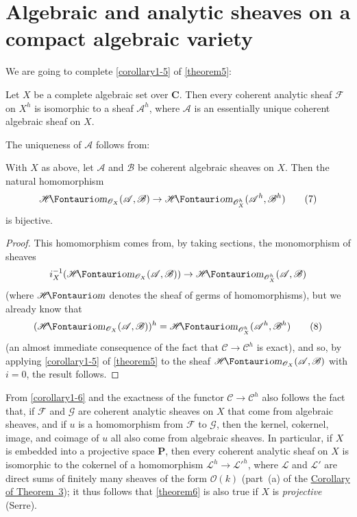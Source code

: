 \documentclass{article}
\theoremstyle{plain}
\newenvironment{theorem}[1]
    {\renewcommand\theinnercustomtheorem{#1}\innercustomtheorem}
    {\endinnercustomtheorem}
\newenvironment{corollary}[1]
    {\renewcommand\theinnercustomcorollary{#1}\innercustomcorollary}
    {\endinnercustomcorollary}
\theoremstyle{definition}
\newcommand{\sh}{\mathscr}
\newcommand{\cat}{\mathcal}
\newcommand{\shHom}{\sh{H}\textup{\kern-2.2pt{\Fontauri\slshape om}}}
\newcommand{\oldpage}[1]{\marginpar{\footnotesize$\Big\vert$ \textit{p.~#1}}}
\begin{document}
\section{Algebraic and analytic sheaves on a compact algebraic variety}
\label{section8}

We are going to complete \cref{corollary1-5} of \cref{theorem5}:

\begin{theorem}{6}
\label{theorem6}
  Let $X$ be a complete algebraic set over $\mathbf{C}$.
  Then every coherent analytic sheaf $\sh{F}$ on $X^h$ is isomorphic to a sheaf $\sh{A}^h$, where $\sh{A}$ is an essentially unique coherent algebraic sheaf on $X$.
\end{theorem}

The uniqueness of $\sh{A}$ follows from:

\begin{corollary}{1}
\label{corollary1-6}
  With $X$ as above, let $\sh{A}$ and $\sh{B}$ be coherent algebraic sheaves on $X$.
  Then the natural homomorphism
  \[
  \label{equation7}
    \shHom_{\sh{O}_X}(\sh{A},\sh{B}) \to \shHom_{\sh{O}_X^h}(\sh{A}^h,\sh{B}^h)
    \tag{7}
  \]
  is bijective.
\end{corollary}

\begin{proof}
  This homomorphism comes from, by taking sections, the monomorphism of sheaves
  \[
    i_X^{-1}(\shHom_{\sh{O}_X}(\sh{A},\sh{B})) \to \shHom_{\sh{O}_X^h}(\sh{A},\sh{B})
  \]
  (where $\shHom$ denotes the sheaf of germs of homomorphisms), but we already know that
  \[
  \label{equation8}
    (\shHom_{\sh{O}_X}(\sh{A},\sh{B}))^h = \shHom_{\sh{O}_X^h}(\sh{A}^h,\sh{B}^h)
    \tag{8}
  \]
  (an almost immediate consequence of the fact that $\cat{C}\to\cat{C}^h$ is exact), and so, by applying \cref{corollary1-5} of \cref{theorem5} to the sheaf $\shHom_{\sh{O}_X}(\sh{A},\sh{B})$ with $i=0$, the result follows.
\end{proof}

From \cref{corollary1-6} and the exactness of the functor $\cat{C}\to\cat{C}^h$ also follows the fact that, if $\sh{F}$ and $\sh{G}$ are coherent analytic sheaves on $X$ that come from algebraic sheaves, and if $u$ is a homomorphism from $\sh{F}$ to $\sh{G}$, then the kernel, cokernel, image, and coimage of $u$ all also come
\oldpage{2-15}
from algebraic sheaves.
In particular, if $X$ is embedded into a projective space $\mathbf{P}$, then every coherent analytic sheaf on $X$ is isomorphic to the cokernel of a homomorphism $\sh{L}^h\to\sh{L}'^h$, where $\sh{L}$ and $\sh{L}'$ are direct sums of finitely many sheaves of the form $\sh{O}(k)$ (part~(a) of the \hyperref[corollary-3]{Corollary of Theorem~3});
it thus follows that \cref{theorem6} is also true if $X$ is \emph{projective} (Serre).
\end{document}
